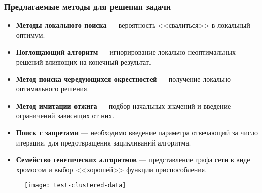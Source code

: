 \begin{frame}
    \frametitle{Предлагаемые методы для решения задачи}
    \small
    \begin{itemize}
        \item \textbf{Методы локального поиска} --- вероятность <<свалиться>> в локальный оптимум.
        \item \textbf{Поглощающий алгоритм} --- игнорирование локально неоптимальных решений влияющих на 
            конечный результат.
        \item \textbf{Метод поиска чередующихся окрестностей} --- получение локально оптимального решения.
        \item \textbf{Метод имитации отжига} --- подбор начальных значений и введение ограничений зависящих 
            от них.
        \item \textbf{Поиск с запретами} --- необходимо введение параметра отвечающий за число итерация, 
            для предотвращения зацикливаний алгоритма.
        \item \textbf{Семейство генетических алгоритмов} --- представление графа сети в виде хромосом и 
            выбор <<хорошей>> функции приспособления.
    \end{itemize}
\end{frame}

\begin{frame}
    \begin{figure}
        \centering
        \texttt{[image: test-clustered-data]}
    \end{figure}
\end{frame}

